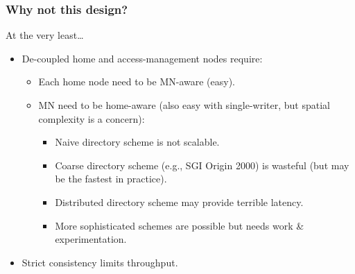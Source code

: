 \documentclass{beamer}
\begin{document}
\begin{frame}
    \frametitle{Why not this design?}
    At the very least\dots
    \begin{itemize}
        \item {
            De-coupled home and access-management nodes require:
            \begin{itemize}
                \item Each home node need to be MN-aware (easy).
                \item {
                    MN need to be home-aware (also easy with single-writer, but spatial complexity is a concern):
                    \begin{itemize}
                        \item Naive directory scheme is not scalable.
                        \item Coarse directory scheme (e.g., SGI Origin 2000) is wasteful (but may be the fastest in practice).
                        \item Distributed directory scheme may provide terrible latency.
                        \item More sophisticated schemes are possible but needs work \& experimentation.
                    \end{itemize}
                }
            \end{itemize}
        }
        \item Strict consistency limits throughput.
    \end{itemize}
\end{frame}
\end{document}
